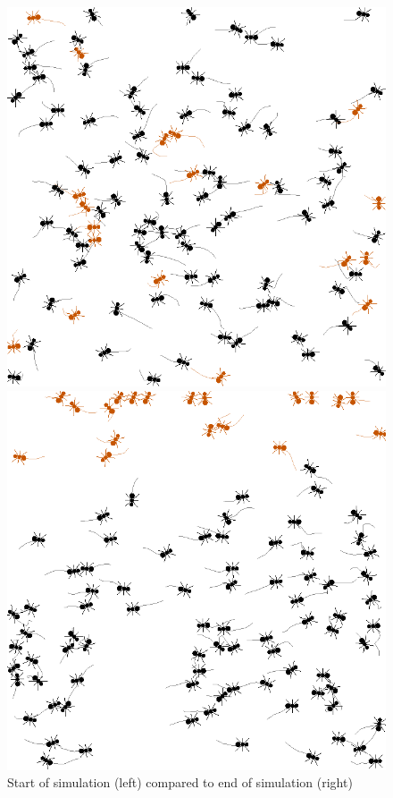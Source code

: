 \documentclass[9pt]{IEEEtran}
\begin{document}
\begin{figure}[hbt]
    \centering
    \begin{minipage}{0.2\textwidth}
        \centering
        \includegraphics[width=.9\linewidth]{frame_25.png}
    \end{minipage}
    \hspace{0.2cm}
    \begin{minipage}{0.2\textwidth}
        \centering
        \includegraphics[width=.9\linewidth]{frame_1300.png}
    \end{minipage}
    \caption{Start of simulation (left) compared to end of simulation (right)}
    \label{fig:trained_viz}
\end{figure}
\end{document}
